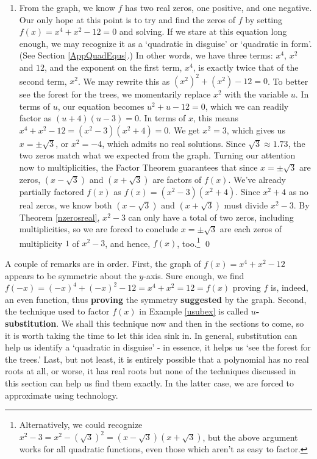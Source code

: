 \documentclass{ximera}
\begin{document}
\begin{example}
\begin{enumerate}
\item  From the graph, we know $f$ has two real zeros, one positive, and one negative.  Our only hope at this point is to try and find the zeros of $f$ by setting $f(x)=x^4+x^2-12=0$ and solving.  If we stare at this equation long enough, we may recognize it as a `quadratic in disguise' or `quadratic in form'. (See Section \ref{AppQuadEqus}.)   In other words, we have three terms: $x^4$, $x^2$ and $12$, and the exponent on the first term, $x^4$, is exactly twice that of the second term, $x^2$.  We may rewrite this as $\left(x^2\right)^2 + \left(x^2\right) - 12 = 0$.  To better see the forest for the trees, we momentarily replace $x^2$ with the variable $u$.  In terms of $u$, our equation becomes $u^2 + u - 12 = 0$, which we can readily factor as $(u+4)(u-3) = 0$.  In terms of $x$, this means $x^4+x^2-12= \left(x^2-3\right) \left(x^2 + 4 \right)=0$. We get $x^2 = 3$, which gives us $x = \pm \sqrt{3}$, or $x^2=-4$, which admits no real solutions.  Since $\sqrt{3} \approx 1.73$, the two zeros match what we expected from the graph.  Turning our attention now to multiplicities, the Factor Theorem guarantees that since $x = \pm \sqrt{3}$ are zeros, $(x- \sqrt{3})$ and $(x + \sqrt{3})$ are factors of $f(x)$.  We've already partially factored  $f(x)$ as $f(x)  = \left(x^2-3\right) \left(x^2 + 4 \right)$.  Since $x^2+4$ as no real zeros, we know both $(x-\sqrt{3})$ and $(x+\sqrt{3})$ must divide $x^2-3$.  By Theorem \ref{nzerosreal},  $x^2-3$ can only have a total of two zeros, including multiplicities, so we are forced to conclude $x = \pm \sqrt{3}$ are each zeros of multiplicity $1$ of $x^2-3$, and hence, $f(x)$, too.\footnote{Alternatively, we could recognize $x^2 -3 = x^2-(\sqrt{3})^2 = (x-\sqrt{3})(x+\sqrt{3})$, but the above argument works for all quadratic functions, even those which aren't as easy to factor.} \qed

\end{enumerate}

\label{usubex}

\end{example}

A couple of remarks are in order.  First, the graph of $f(x) = x^4 + x^2 - 12$ appears to be symmetric about the $y$-axis.  Sure enough, we find $f(-x) = (-x)^4+(-x)^2  - 12 = x^4+x^2=12 = f(x)$ proving $f$ is, indeed, an even function, thus \textbf{proving} the symmetry \textbf{suggested} by the graph.  Second, the technique used to factor $f(x)$ in Example \ref{usubex} is called  \textbf{{\boldmath $u$}-substitution}.  We shall this technique now and then in the sections to come, so it is worth taking the time to let this idea sink in.  In general, substitution can help us identify a `quadratic in disguise' - in essence, it helps us `see the forest for the trees.'  Last, but not least, it is entirely possible that a polynomial has no real roots at all, or worse, it has real roots but none of the techniques discussed in this section can help us find them exactly.  In the latter case, we are forced to approximate using technology.  
\end{document}
